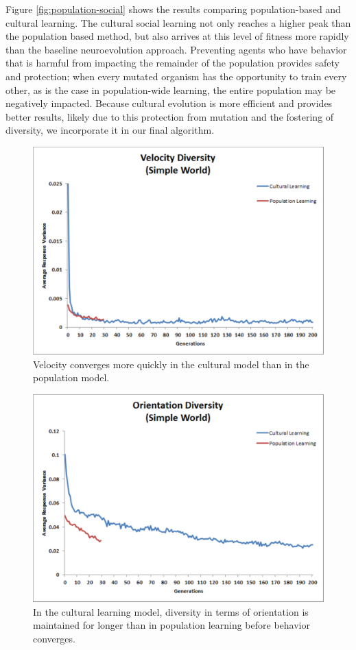 \documentclass{acm_proc_article-sp}
\begin{document}
Figure \ref{fig:population-social} shows the results comparing population-based and cultural learning. The cultural social learning not only reaches a higher peak than the population based method, but also arrives at this level of fitness more rapidly than the baseline neuroevolution approach. Preventing agents who have behavior that is harmful from impacting the remainder of the population provides safety and protection; when every mutated organism has the opportunity to train every other, as is the case in population-wide learning, the entire population may be negatively impacted. Because cultural evolution is more efficient and provides better results, likely due to this protection from mutation and the fostering of diversity, we incorporate it in our final algorithm.

\begin{figure}
  \centering
    \includegraphics[scale=.35]{velocity_diversity.pdf}
  \caption{Velocity converges more quickly in the cultural model than in the population model.}
  \label{fig:velocity}
\end{figure}

\begin{figure}
  \centering
    \includegraphics[scale=.35]{orientation_diversity.pdf}
  \caption{In the cultural learning model, diversity in terms of orientation is maintained for longer than in population learning before behavior converges.}
  \label{fig:orientation}
\end{figure}
\end{document}
